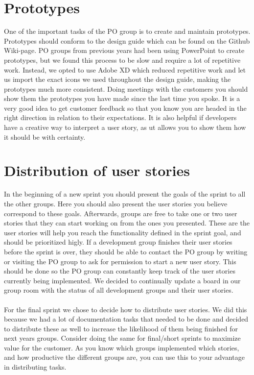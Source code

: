 \section{Prototypes}
One of the important tasks of the PO group is to create and maintain prototypes.
Prototypes should conform to the design guide which can be found on the Github Wiki-page.
PO groups from previous years had been using PowerPoint to create prototypes, but we found this process to be slow and require a lot of repetitive work.
Instead, we opted to use Adobe XD which reduced repetitive work and let us import the exact icons we used throughout the design guide, making the prototypes much more consistent.
Doing meetings with the customers you should show them the prototypes you have made since the last time you spoke.
It is a very good idea to get customer feedback so that you know you are headed in the right direction in relation to their expectations.
It is also helpful if developers have a creative way to interpret a user story, as ut allows you to show them how it should be with certainty.

\section{Distribution of user stories}
In the beginning of a new sprint you should present the goals of the sprint to all the other groups.
Here you should also present the user stories you believe correspond to these goals.
Afterwards, groups are free to take one or two user stories that they can start working on from the ones you presented.
These are the user stories will help you reach the functionality defined in the sprint goal, and should be prioritized higly.
If a development group finishes their user stories before the sprint is over, they should be able to contact the PO group by writing or visiting the PO group to ask for permission to start a new user story.
This should be done so the PO group can constantly keep track of the user stories currently being implemented.
We decided to continually update a board in our group room with the status of all development groups and their user stories.
\\\\
For the final sprint we chose to decide how to distribute user stories.
We did this because we had a lot of documentation tasks that needed to be done and decided to distribute these as well to increase the likelihood of them being finished for next years groups.
Consider doing the same for final/short sprints to maximize value for the customer.
As you know which groups implemented which stories, and how productive the different groups are, you can use this to your advantage in distributing tasks.


